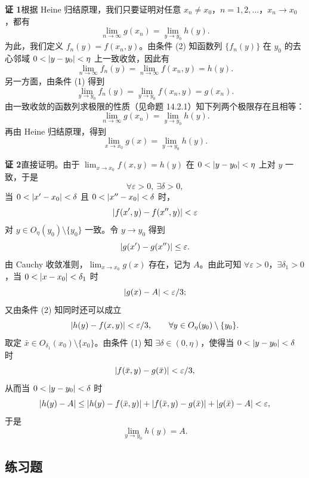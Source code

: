 \begin{xproof}
\textbf{证 1}\quad 根据 Heine 归结原理，我们只要证明对任意 $x_n\ne x_0$，$n=1,2,\ldots$，$x_n\to x_0$，都有
\[
  \lim_{n\to\infty}g(x_n)=\lim_{y\to y_0}h(y).
\]
为此，我们定义 $f_n(y)=f(x_n,y)$。由条件 (2) 知函数列 $\{f_n(y)\}$ 在 $y_0$ 的去心邻域 $0<\lvert y-y_0\rvert<\eta$ 上一致收敛，因此有
\[
  \lim_{n\to\infty}f_n(y)
  =\lim_{n\to\infty}f(x_n,y)=h(y).
\]
另一方面，由条件 (1) 得到
\[
  \lim_{y\to y_0}f_n(y)
  =\lim_{y\to y_0}f(x_n,y)=g(x_n).
\]
由一致收敛的函数列求极限的性质（见命题 14.2.1）知下列两个极限存在且相等：
\[
  \lim_{n\to\infty}g(x_n)=\lim_{y\to y_0}h(y).
\]
再由 Heine 归结原理，得到
\[
  \lim_{x\to x_0}g(x)=\lim_{y\to y_0}h(y).
\]

\textbf{证 2}\quad 直接证明。由于 $\displaystyle\lim_{x\to x_0}f(x,y)=h(y)$ 在 $0<\lvert y-y_0\rvert<\eta$ 上对 $y$ 一致，于是
\[
  \forall\varepsilon>0,\ \exists\delta>0,
\]
当 $0<\lvert x'-x_0\rvert<\delta$ 且 $0<\lvert x''-x_0\rvert<\delta$ 时，
\[
  \lvert f(x',y)-f(x'',y)\rvert<\varepsilon
\]
对 $y\in O_\eta(y_0)\setminus\{y_0\}$ 一致。令 $y\to y_0$ 得到
\[
  \lvert g(x')-g(x'')\rvert\le\varepsilon.
\]
由 Cauchy 收敛准则，$\displaystyle\lim_{x\to x_0}g(x)$ 存在，记为 $A$。由此可知 $\forall\varepsilon>0$，$\exists\delta_1>0$，当 $0<\lvert x-x_0\rvert<\delta_1$ 时
\[
  \lvert g(x)-A\rvert<\varepsilon/3;
\]
又由条件 (2) 知同时还可以成立
\[
  \lvert h(y)-f(x,y)\rvert<\varepsilon/3,
  \qquad \forall y\in O_\eta(y_0)\setminus\{y_0\}.
\]
取定 $\bar x\in O_{\delta_1}(x_0)\setminus\{x_0\}$。由条件 (1) 知 $\exists\delta\in(0,\eta)$，使得当 $0<\lvert y-y_0\rvert<\delta$ 时
\[
  \lvert f(\bar x,y)-g(\bar x)\rvert<\varepsilon/3,
\]
从而当 $0<\lvert y-y_0\rvert<\delta$ 时
\[
  \lvert h(y)-A\rvert
  \le \lvert h(y)-f(\bar x,y)\rvert
  +\lvert f(\bar x,y)-g(\bar x)\rvert
  +\lvert g(\bar x)-A\rvert<\varepsilon,
\]
于是
\[
  \lim_{y\to y_0}h(y)=A.
\]
\end{xproof}

\subsection{练习题}

